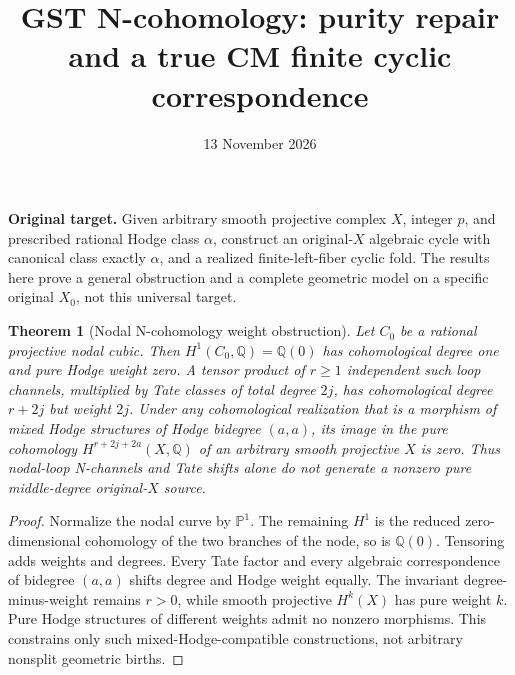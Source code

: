 \documentclass[11pt]{article}
\title{GST N-cohomology: purity repair and a true CM finite cyclic correspondence}
\date{13 November 2026}
\newtheorem{theorem}{Theorem}
\newcommand{\Q}{\mathbb Q}
\begin{document}
\maketitle
\noindent\textbf{Original target.} Given arbitrary smooth projective complex \(X\), integer \(p\), and prescribed rational Hodge class \(\alpha\), construct an original-\(X\) algebraic cycle with canonical class exactly \(\alpha\), and a realized finite-left-fiber cyclic fold. The results here prove a general obstruction and a complete geometric model on a specific original \(X_0\), not this universal target.

\begin{theorem}[Nodal N-cohomology weight obstruction]
Let \(C_0\) be a rational projective nodal cubic. Then \(H^1(C_0,\Q)=\Q(0)\) has cohomological degree one and pure Hodge weight zero. A tensor product of \(r\ge1\) independent such loop channels, multiplied by Tate classes of total degree \(2j\), has cohomological degree \(r+2j\) but weight \(2j\). Under any cohomological realization that is a morphism of mixed Hodge structures of Hodge bidegree \((a,a)\), its image in the pure cohomology \(H^{r+2j+2a}(X,\Q)\) of an arbitrary smooth projective \(X\) is zero. Thus nodal-loop N-channels and Tate shifts alone do not generate a nonzero pure middle-degree original-\(X\) source.
\end{theorem}
\begin{proof}
Normalize the nodal curve by \(\mathbb P^1\). The remaining \(H^1\) is the reduced zero-dimensional cohomology of the two branches of the node, so is \(\Q(0)\). Tensoring adds weights and degrees. Every Tate factor and every algebraic correspondence of bidegree \((a,a)\) shifts degree and Hodge weight equally. The invariant degree-minus-weight remains \(r>0\), while smooth projective \(H^k(X)\) has pure weight \(k\). Pure Hodge structures of different weights admit no nonzero morphisms. This constrains only such mixed-Hodge-compatible constructions, not arbitrary nonsplit geometric births.
\end{proof}
\end{document}
